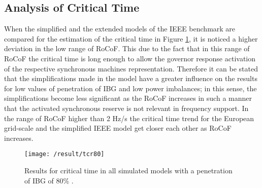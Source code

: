 
\subsection{Analysis of Critical Time}


When the simplified and the extended models of the IEEE benchmark are compared for the estimation of the critical time in Figure \ref{fig:res_tcr}, it is noticed a higher deviation in the low range of RoCoF. This due to the fact that in this range of RoCoF the critical time is long enough to allow the governor response activation of the respective synchronous machines representation. Therefore it can be stated that the simplifications made in the model have a greater influence on the results for low values of penetration of IBG and low power imbalances; in this sense, the simplifications become less significant as the RoCoF increases in such a manner that the activated synchronous reserve is not relevant in frequency support. In the range of RoCoF higher than 2 Hz/s the critical time trend for the European grid-scale and the simplified IEEE model get closer each other as RoCoF increases.

\begin{figure}[h]
	\centering
	\texttt{[image: /result/tcr80]}
	\caption{Results for critical time in all simulated models with a penetration of IBG of 80\% .}
	\label{fig:res_tcr}
\end{figure}


